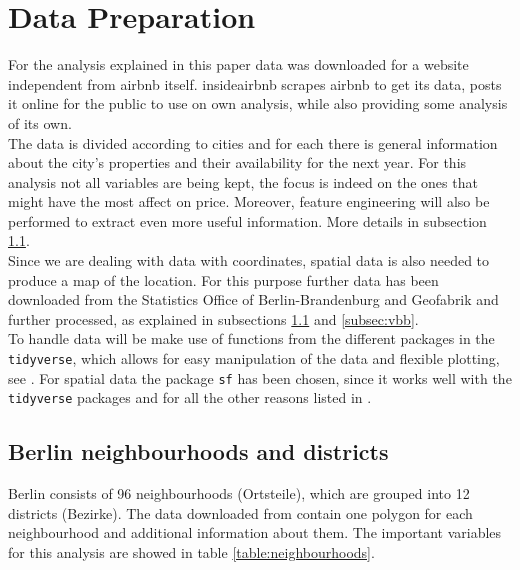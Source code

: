 \section{Data Preparation}\label{Sec:Data Preparation}

For the analysis explained in this paper data was downloaded for a website independent from airbnb itself. insideairbnb \citep{airbnb} scrapes airbnb to get its data, posts it online for the public to use on own analysis, while also providing some analysis of its own.
\\
The data is divided according to cities and for each there is general information about the city's properties and their availability for the next year. For this analysis not all variables are being kept, the focus is indeed on the ones that might have the most affect on price. Moreover, feature engineering will also be performed to extract even more useful information. More details in subsection \ref{subsec:berlin}.
\\
Since we are dealing with data with coordinates, spatial data is also needed to produce a map of the location. For this purpose further data has been downloaded from the Statistics Office of Berlin-Brandenburg \citep{statberlin:2018} and Geofabrik \citep{geofabrik:2018} and further processed, as explained in subsections \ref{subsec:berlin} and \ref{subsec:vbb}.
\\
To handle data will be make use of functions from the different packages in the \texttt{tidyverse}, which allows for easy manipulation of the data and flexible plotting, see \cite{ross2017declutter}. For spatial data the package \texttt{sf} has been chosen, since it works well with the \texttt{tidyverse} packages and for all the other reasons listed in \cite{pebesma2018simple}.


\subsection{Berlin neighbourhoods and districts}\label{subsec:berlin}

Berlin consists of 96 neighbourhoods (Ortsteile), which are grouped into 12 districts (Bezirke). The data downloaded from  \citep{statberlin:2018} contain one polygon for each neighbourhood and additional information about them. The important variables for this analysis are showed in table \ref{table:neighbourhoods}.

